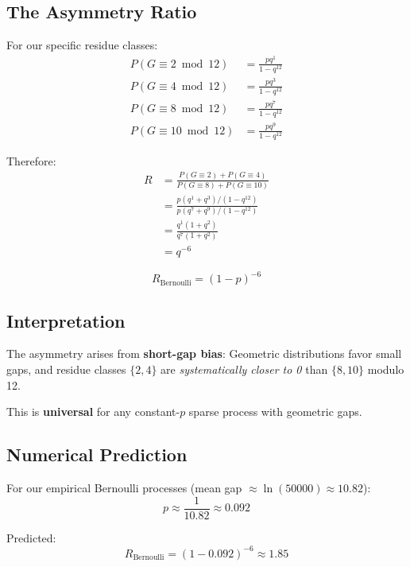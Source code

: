 \documentclass[11pt,a4paper]{article}
\theoremstyle{definition}
\theoremstyle{remark}
\begin{document}
\subsection{The Asymmetry Ratio}

For our specific residue classes:
\begin{align}
P(G \equiv 2 \bmod 12) &= \frac{p q^{1}}{1-q^{12}} \\
P(G \equiv 4 \bmod 12) &= \frac{p q^{3}}{1-q^{12}} \\
P(G \equiv 8 \bmod 12) &= \frac{p q^{7}}{1-q^{12}} \\
P(G \equiv 10 \bmod 12) &= \frac{p q^{9}}{1-q^{12}}
\end{align}

Therefore:
\begin{align}
R &= \frac{P(G \equiv 2) + P(G \equiv 4)}{P(G \equiv 8) + P(G \equiv 10)} \\
&= \frac{p(q^1 + q^3)/(1-q^{12})}{p(q^7 + q^9)/(1-q^{12})} \\
&= \frac{q^1(1 + q^2)}{q^7(1 + q^2)} \\
&= q^{-6}
\end{align}

\begin{equation}
\boxed{R_{\text{Bernoulli}} = (1-p)^{-6}}
\end{equation}

\subsection{Interpretation}

The asymmetry arises from \textbf{short-gap bias}: Geometric distributions favor small gaps, and residue classes $\{2, 4\}$ are \emph{systematically closer to 0} than $\{8, 10\}$ modulo 12.

This is \textbf{universal} for any constant-$p$ sparse process with geometric gaps.

\subsection{Numerical Prediction}

For our empirical Bernoulli processes (mean gap $\approx \ln(50000) \approx 10.82$):
\begin{equation}
p \approx \frac{1}{10.82} \approx 0.092
\end{equation}

Predicted:
\begin{equation}
R_{\text{Bernoulli}} = (1 - 0.092)^{-6} \approx 1.85
\end{equation}
\end{document}
